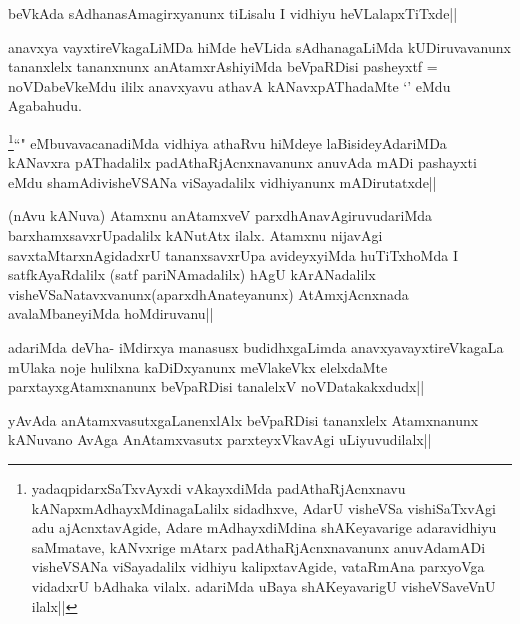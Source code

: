 \begin{artha}
beVkAda sAdhanasAmagirxyanunx tiLisalu I vidhiyu heVLalapxTiTxde||
\end{artha}

\begin{artha}
anavxya vayxtireVkagaLiMDa hiMde heVLida sAdhanagaLiMda kUDiruvavanunx tananxlelx tananxnunx anAtamxrAshiyiMda beVpaRDisi pasheyxtf = noVDabeVkeMdu ililx anavxyavu athavA kANavxpAThadaMte `\stext' eMdu Agabahudu.
\end{artha}

\begin{artha}
\footnote{yadaqpidarxSaTxvAyxdi vAkayxdiMda padAthaRjAcnxnavu kANapxmAdhayxMdinagaLalilx sidadhxve, AdarU visheVSa vishiSaTxvAgi adu ajAcnxtavAgide, Adare mAdhayxdiMdina shAKeyavarige adaravidhiyu saMmatave, kANvxrige mAtarx padAthaRjAcnxnavanunx anuvAdamADi visheVSANa viSayadalilx vidhiyu kalipxtavAgide, vataRmAna parxyoVga vidadxrU bAdhaka vilalx. adariMda uBaya shAKeyavarigU visheVSaveVnU ilalx||}``\stext" eMbuvavacanadiMda vidhiya athaRvu hiMdeye laBisideyAdariMDa kANavxra pAThadalilx padAthaRjAcnxnavanunx anuvAda mADi pashayxti eMdu shamAdivisheVSANa viSayadalilx vidhiyanunx mADirutatxde||
\end{artha}


\begin{artha}
(nAvu kANuva) Atamxnu anAtamxveV parxdhAnavAgiruvudariMda barxhamxsavxrUpadalilx kANutAtx ilalx. Atamxnu nijavAgi savxtaMtarxnAgidadxrU tananxsavxrUpa avideyxyiMda huTiTxhoMda I satfkAyaRdalilx (satf pariNAmadalilx) hAgU kArANadalilx visheVSaNatavxvanunx(aparxdhAnateyanunx) AtAmxjAcnxnada avalaMbaneyiMda hoMdiruvanu||
\end{artha}


\begin{artha}
adariMda deVha- iMdirxya manasusx budidhxgaLimda anavxyavayxtireVkagaLa mUlaka noje hulilxna kaDiDxyanunx meVlakeVkx elelxdaMte parxtayxgAtamxnanunx beVpaRDisi tanalelxV noVDatakakxdudx||
\end{artha}

\begin{artha}
yAvAda anAtamxvasutxgaLanenxlAlx beVpaRDisi tananxlelx Atamxnanunx kANuvano AvAga AnAtamxvasutx parxteyxVkavAgi uLiyuvudilalx||
\end{artha}


